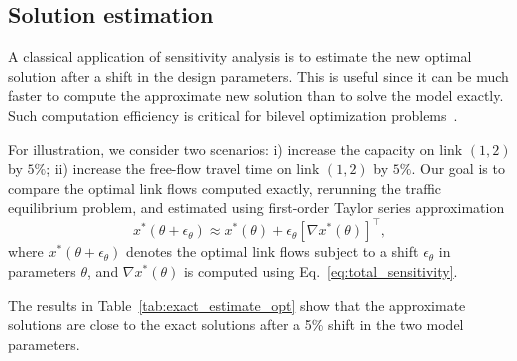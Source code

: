 \documentclass[a4paper,11pt]{article}
\begin{document}
\subsection{Solution estimation}
A classical application of sensitivity analysis is to estimate the new optimal solution after a shift in the design parameters. This is useful since it can be much faster to compute the approximate new solution than to solve the model exactly. Such computation efficiency is critical for bilevel optimization problems~\citep[e.g.,][]{yang1997traffic,josefsson2007sensitivity,liu2022inducing}.



For illustration, we consider two scenarios: i) increase the capacity on link $(1, 2)$ by $5\%$; ii) increase the free-flow travel time on link $(1, 2)$ by $5\%$. Our goal is to compare the optimal link flows computed exactly, rerunning the traffic equilibrium problem, and estimated using first-order Taylor series approximation
\begin{equation}
    x^{*}(\theta +\epsilon_{\theta}) \approx x^{*}(\theta) + \epsilon_{\theta} [\nabla x^*(\theta)]^\top,
\end{equation}
where $x^{*}(\theta +\epsilon_{\theta})$ denotes the optimal link flows subject to a shift $\epsilon_{\theta}$ in parameters $\theta$, and $\nabla x^*(\theta)$ is computed using Eq.~\eqref{eq:total_sensitivity}.

The results in Table~\ref{tab:exact_estimate_opt} show that the approximate solutions are close to the exact solutions after a 5\% shift in the two model parameters. 
\end{document}
